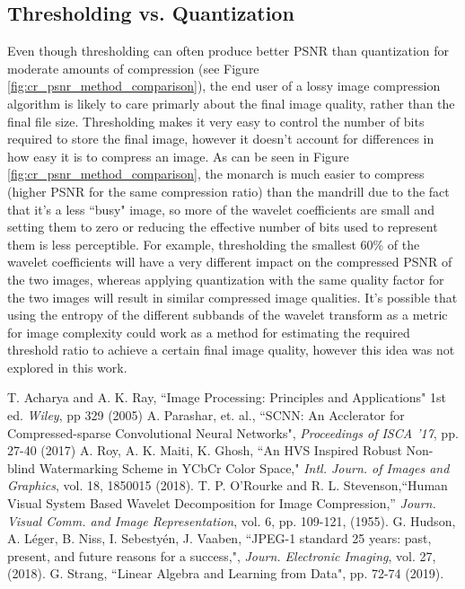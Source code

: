 \documentclass[conference]{IEEEtran}
\begin{document}
\subsection{Thresholding vs. Quantization}
Even though thresholding can often produce better PSNR than quantization for moderate amounts of compression (see Figure \ref{fig:cr_psnr_method_comparison}), the end user of a lossy image compression algorithm is likely to care primarly about the final image quality, rather than the final file size.
Thresholding makes it very easy to control the number of bits required to store the final image, however it doesn't account for differences in how easy it is to compress an image.
As can be seen in Figure \ref{fig:cr_psnr_method_comparison}, the monarch is much easier to compress (higher PSNR for the same compression ratio) than the mandrill due to the fact that it's a less ``busy" image, so more of the wavelet coefficients are small and setting them to zero or reducing the effective number of bits used to represent them is less perceptible.
For example, thresholding the smallest 60\% of the wavelet coefficients will have a very different impact on the compressed PSNR of the two images,
whereas applying quantization with the same quality factor for the two images will result in similar compressed image qualities.
It's possible that using the entropy of the different subbands of the wavelet transform as a metric for image complexity could work as a method for estimating the required threshold ratio to achieve a certain final image quality, however this idea was not explored in this work.

\begin{thebibliography}{00}
     T. Acharya and A. K. Ray, ``Image Processing: Principles and Applications" 1st ed. \textit{Wiley}, pp 329 (2005)
     A. Parashar, et. al., ``SCNN: An Acclerator for Compressed-sparse Convolutional Neural Networks", \textit{Proceedings of ISCA '17}, pp. 27-40 (2017)
     A. Roy, A. K. Maiti, K. Ghosh, ``An HVS Inspired Robust Non-blind Watermarking Scheme in YCbCr Color Space," \textit{Intl. Journ. of Images and Graphics}, vol. 18, 1850015 (2018).
     T. P. O'Rourke and R. L. Stevenson,``Human Visual System Based Wavelet Decomposition for Image Compression,'' \textit{Journ. Visual Comm. and Image Representation}, vol. 6, pp. 109-121, (1955).
     G. Hudson, A. L{\'e}ger, B. Niss, I. Sebesty{\'e}n, J. Vaaben, ``JPEG-1 standard 25 years: past, present, and future reasons for a success,", \textit{Journ. Electronic Imaging}, vol. 27, (2018).
     G. Strang, ``Linear Algebra and Learning from Data", pp. 72-74 (2019).
\end{thebibliography}
\end{document}
